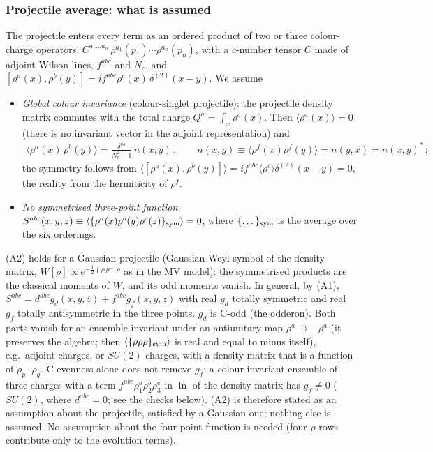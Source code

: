\documentclass[10pt]{article}
\begin{document}
\subsubsection{Projectile average: what is assumed}
\noindent The projectile enters every term as an ordered product of two or three colour-charge operators, $C^{a_{1}\dots a_{n}}\,\rho^{a_{1}}(p_{1})\cdots\rho^{a_{n}}(p_{n})$, with a $c$-number tensor $C$ made of adjoint Wilson lines, $f^{abc}$ and $N_{c}$, and $[\rho^{a}(x),\rho^{b}(y)]=if^{abc}\rho^{c}(x)\,\delta^{(2)}(x-y)$. We assume
\begin{itemize}
\item[(A1)] \emph{Global colour invariance} (colour-singlet projectile): the projectile density matrix commutes with the total charge $Q^{a}=\int_{x}\rho^{a}(x)$. Then $\langle\rho^{a}(x)\rangle=0$ (there is no invariant vector in the adjoint representation) and
\begin{align}
\langle\rho^{a}(x)\,\rho^{b}(y)\rangle=\frac{\delta^{ab}}{N_{c}^{2}-1}\,n(x,y)\,,\qquad n(x,y)\equiv\langle\rho^{f}(x)\rho^{f}(y)\rangle=n(y,x)=n(x,y)^{*}\,;\label{eq:s-A1}
\end{align}
the symmetry follows from $\langle[\rho^{a}(x),\rho^{b}(y)]\rangle=if^{abc}\langle\rho^{c}\rangle\delta^{(2)}(x-y)=0$, the reality from the hermiticity of $\rho^{f}$.
\item[(A2)] \emph{No symmetrised three-point function}: $S^{abc}(x,y,z)\equiv\langle\{\rho^{a}(x)\rho^{b}(y)\rho^{c}(z)\}_{\rm sym}\rangle=0$, where $\{\dots\}_{\rm sym}$ is the average over the six orderings.
\end{itemize}
(A2) holds for a Gaussian projectile (Gaussian Weyl symbol of the density matrix, $W[\rho]\propto e^{-\frac12\int\rho\,\mu^{-1}\rho}$ as in the MV model): the symmetrised products are the classical moments of $W$, and its odd moments vanish. In general, by (A1), $S^{abc}=d^{abc}g_{d}(x,y,z)+f^{abc}g_{f}(x,y,z)$ with real $g_{d}$ totally symmetric and real $g_{f}$ totally antisymmetric in the three points. $g_{d}$ is C-odd (the odderon). Both parts vanish for an ensemble invariant under an antiunitary map $\rho^{a}\to-\rho^{a}$ (it preserves the algebra; then $\langle\{\rho\rho\rho\}_{\rm sym}\rangle$ is real and equal to minus itself), e.g.\ adjoint charges, or $SU(2)$ charges, with a density matrix that is a function of $\rho_{p}\cdot\rho_{q}$. C-evenness alone does not remove $g_{f}$: a colour-invariant ensemble of three charges with a term $f^{abc}\rho^{a}_{1}\rho^{b}_{2}\rho^{c}_{3}$ in $\ln$ of the density matrix has $g_{f}\neq0$ ($SU(2)$, where $d^{abc}=0$; see the checks below). (A2) is therefore stated as an assumption about the projectile, satisfied by a Gaussian one; nothing else is assumed. No assumption about the four-point function is needed (four-$\rho$ rows contribute only to the evolution terms).
\end{document}
